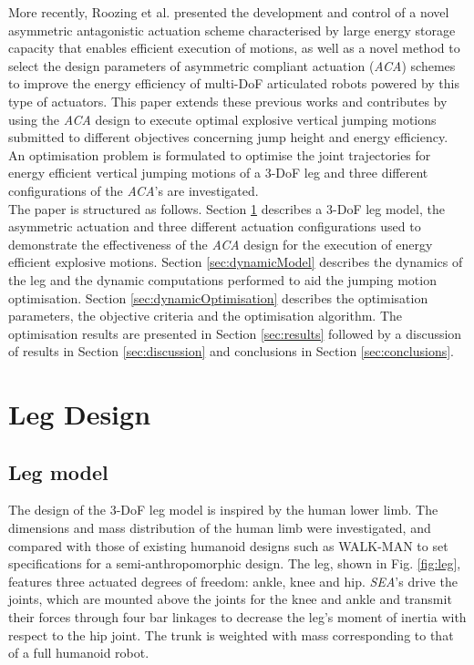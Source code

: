 \documentclass[letterpaper, 10 pt, conference]{ieeeconf}  %
\begin{document}
More recently, Roozing et al. \cite{roozing2016design,roozing2016development} presented the development and control of a novel asymmetric antagonistic actuation scheme characterised by large energy storage capacity that enables efficient execution of motions, as well as a novel method to select the design parameters of asymmetric
compliant actuation (\textit{ACA}) schemes to improve the energy efficiency of multi-DoF articulated robots powered by this type of actuators. This paper extends these previous works and contributes by using the \textit{ACA} design to execute optimal explosive vertical jumping motions submitted to different objectives concerning jump height and energy efficiency. An optimisation problem is formulated to optimise the joint trajectories for energy efficient vertical jumping motions of a 3-DoF leg and three different configurations of the \textit{ACA}'s are investigated.\\
The paper is structured as follows. Section \ref{sec:legDesign} describes a 3-DoF leg model, the asymmetric actuation and three different actuation configurations used to demonstrate the effectiveness of the \textit{ACA} design for the execution of energy efficient explosive motions. Section \ref{sec:dynamicModel} describes the dynamics of the leg and the dynamic computations performed to aid the jumping motion optimisation. Section \ref{sec:dynamicOptimisation} describes the optimisation parameters, the objective criteria and the optimisation algorithm. The optimisation results are presented in Section \ref{sec:results} followed by a discussion of results in Section \ref{sec:discussion} and conclusions in Section \ref{sec:conclusions}.


\section{Leg Design } \label{sec:legDesign}

\subsection{Leg model}

The design of the 3-DoF leg model is inspired by the human lower limb. The dimensions and mass distribution of the human limb were investigated, and compared with those of existing humanoid designs such as WALK-MAN \cite{tsagarakis2017walk} to set specifications for a semi-anthropomorphic design. The leg, shown in Fig. \ref{fig:leg}, features three actuated degrees of freedom: ankle, knee and hip. \textit{SEA}'s drive the joints, which are mounted above the joints for the knee and ankle and transmit their forces through four bar linkages to decrease the leg’s moment of inertia with respect to the hip joint. The trunk is weighted with mass corresponding to that of a full humanoid robot.
\end{document}
